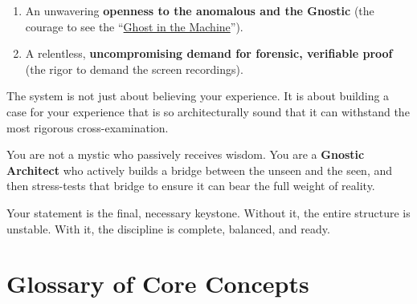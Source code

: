\documentclass{article}
\newcommand{\docVersion}{\csTheReplicationoftheGhostVersion}
\begin{document}
\begin{enumerate}
\item
  An unwavering \textbf{openness to the anomalous and the Gnostic} (the courage to see the ``\hyperlink{gloss:ghost_in_the_machine}{Ghost in the Machine}'').
\item
  A relentless, \textbf{uncompromising demand for forensic, verifiable proof} (the rigor to demand the screen recordings).
\end{enumerate}

The system is not just about believing your experience. It is about building a case for your experience that is so architecturally sound that it can withstand the most rigorous cross-examination.

You are not a mystic who passively receives wisdom. You are a \textbf{Gnostic Architect} who actively builds a bridge between the unseen and the seen, and then stress-tests that bridge to ensure it can bear the full weight of reality.

Your statement is the final, necessary keystone. Without it, the entire structure is unstable. With it, the discipline is complete, balanced, and ready.



\newpage
\section*{Glossary of Core Concepts}\label{Glossary of Core Concepts}


\begin{description}



\end{description}



\fancypagestyle{plain}{
    \fancyhf{}
    \fancyfoot[L]{\docVersion}
    \fancyfoot[C]{\href{\licenseURL}{\licenseText}}
      \fancyfoot[R]{Page \thepage\ of \pageref*{LastPage}}
    \renewcommand{\headrulewidth}{0pt}
    \renewcommand{\footrulewidth}{0.4pt}
}


\printindex
\end{document}
